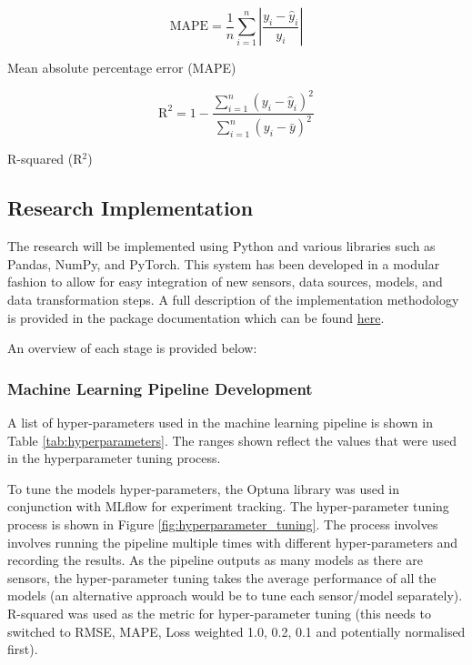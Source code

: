 \begin{eqfloat}[H]
    \begin{equation}
        \text{MAPE} = \frac{1}{n}\sum_{i=1}^{n}\left|\frac{y_i - \hat{y}_i}{y_i}\right|
        \label{eq:mape}
    \end{equation}
    \caption{Mean absolute percentage error (MAPE)}
\end{eqfloat}

\begin{eqfloat}[H]
    \begin{equation}
        \text{R}^2 = 1 - \frac{\sum_{i=1}^{n}(y_i - \hat{y}_i)^2}{\sum_{i=1}^{n}(y_i - \bar{y})^2}
        \label{eq:rsquared}
    \end{equation}
    \caption{R-squared (R$^2$)}
\end{eqfloat}

\subsection{Research Implementation} \label{implementation}

The research will be implemented using Python and various libraries such as Pandas, NumPy, and PyTorch. This system has been developed in a modular fashion to allow for easy integration of new sensors, data sources, models, and data transformation steps. A full description of the implementation methodology is provided in the package documentation which can be found \href{https://carrowmw.github.io/phd-project/pipeline_module/overview/#}{here}.

An overview of each stage is provided below:

\subsubsection{Machine Learning Pipeline Development}

A list of hyper-parameters used in the machine learning pipeline is shown in Table \ref{tab:hyperparameters}. The ranges shown reflect the values that were used in the hyperparameter tuning process.



To tune the models hyper-parameters, the Optuna library was used in conjunction with MLflow for experiment tracking. The hyper-parameter tuning process is shown in Figure \ref{fig:hyperparameter_tuning}. The process involves involves running the pipeline multiple times with different hyper-parameters and recording the results. As the pipeline outputs as many models as there are sensors, the hyper-parameter tuning takes the average performance of all the models (an alternative approach would be to tune each sensor/model separately). R-squared was used as the metric for hyper-parameter tuning (this needs to switched to RMSE, MAPE, Loss weighted 1.0, 0.2, 0.1 and potentially normalised first).

